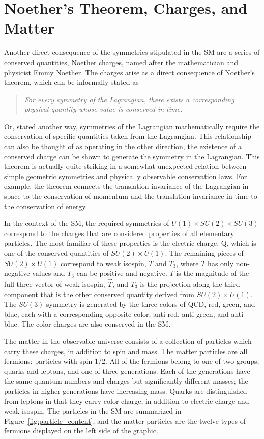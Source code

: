 \section{Noether's Theorem, Charges, and Matter}

Another direct consequence of the symmetries stipulated in the \ac{SM} are a series of conserved quantities, Noether charges, named after the mathematician and physicist Emmy Noether.
The charges arise as a direct consequence of Noether's theorem, which can be informally stated as 
\begin{quote}
\textit{For every symmetry of the Lagrangian, there exists a corresponding physical quantity whose value is conserved in time.}
\end{quote}
\noindent Or, stated another way, symmetries of the Lagrangian mathematically require the conservation of specific quantities taken from the Lagrangian. 
This relationship can also be thought of as operating in the other direction, the existence of a conserved charge can be shown to generate the symmetry in the Lagrangian.
This theorem is actually quite striking in a somewhat unexpected relation between simple geometric symmetries and physically observable conservation laws. 
For example, the theorem connects the translation invariance of the Lagrangian in space to the conservation of momentum and the translation invariance in time to the conservation of energy. 

In the context of the \ac{SM}, the required symmetries of $U(1)\times SU(2) \times SU(3)$ correspond to the charges that are considered properties of all elementary particles.
The most familiar of these properties is the electric charge, Q, which is one of the conserved quantities of $SU(2)\times U(1)$.
The remaining pieces of $SU(2)\times U(1)$ correspond to weak isospin, $T$ and $T_3$, where $T$ has only non-negative values and $T_3$ can be positive and negative.
$T$ is the magnitude of the full three vector of weak isospin, $\vec{T}$, and $T_3$ is the projection along the third component that is the other conserved quantity derived from $SU(2)\times U(1)$.
The $SU(3)$ symmetry is generated by the three colors of \ac{QCD}, red, green, and blue, each with a corresponding opposite color, anti-red, anti-green, and anti-blue.
The color charges are also conserved in the \ac{SM}.


The matter in the observable universe consists of a collection of particles which carry these charges, in addition to spin and mass.
The matter particles are all fermions: particles with spin-1/2.
All of the fermions belong to one of two groups, quarks and leptons, and one of three generations.
Each of the generations have the same quantum numbers and charges but significantly different masses; the particles in higher generations have increasing mass.
Quarks are distinguished from leptons in that they carry color charge, in addition to  electric charge and weak isospin.
The particles in the \ac{SM} are summarized in Figure~\ref{fig:particle_content}, and the matter particles are the twelve types of fermions displayed on the left side of the graphic.


